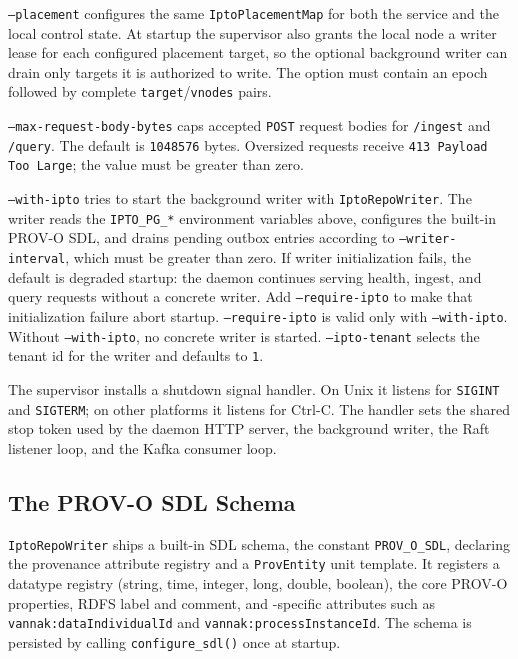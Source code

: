 \texttt{--placement} configures the same \texttt{IptoPlacementMap} for both the
service and the local control state. At startup the supervisor also grants the
local node a writer lease for each configured placement target, so the optional
background writer can drain only targets it is authorized to write. The option
must contain an epoch followed by complete \texttt{target}/\texttt{vnodes} pairs.

\texttt{--max-request-body-bytes} caps accepted \texttt{POST} request bodies
for \texttt{/ingest} and \texttt{/query}. The default is \texttt{1048576}
bytes. Oversized requests receive \texttt{413 Payload Too Large}; the value must
be greater than zero.

\texttt{--with-ipto} tries to start the background writer with
\texttt{IptoRepoWriter}.
The writer reads the \texttt{IPTO\_PG\_*} environment variables above,
configures the built-in PROV-O SDL, and drains pending outbox entries according
to \texttt{--writer-interval}, which must be greater than zero. If writer initialization fails, the default is
degraded startup: the daemon continues serving health, ingest, and query
requests without a concrete \ipto{} writer. Add \texttt{--require-ipto} to make
that initialization failure abort startup. \texttt{--require-ipto} is valid only
with \texttt{--with-ipto}. Without \texttt{--with-ipto}, no
concrete \ipto{} writer is started. \texttt{--ipto-tenant} selects the tenant id
for the writer and defaults to \texttt{1}.

The supervisor installs a shutdown signal handler. On Unix it listens for
\texttt{SIGINT} and \texttt{SIGTERM}; on other platforms it listens for
Ctrl-C. The handler sets the shared stop token used by the daemon HTTP server,
the background writer, the Raft listener loop, and the Kafka consumer loop.

\subsection{The PROV-O SDL Schema}

\texttt{IptoRepoWriter} ships a built-in SDL schema, the constant
\texttt{PROV\_O\_SDL}, declaring the provenance attribute registry and a
\texttt{ProvEntity} unit template. It registers a datatype registry (string,
time, integer, long, double, boolean), the core PROV-O properties, RDFS label
and comment, and \vannak{}-specific attributes such as
\texttt{vannak:dataIndividualId} and \texttt{vannak:processInstanceId}. The
schema is persisted by calling \texttt{configure\_sdl()} once at startup.

